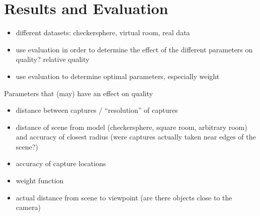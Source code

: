 \chapter{Results and Evaluation}

\begin{itemize}
  \item different datasets: checkersphere, virtual room, real data
  \item use evaluation in order to determine the effect of the different parameters on quality? \ar relative quality
  \item use evaluation to determine optimal parameters, especially weight
\end{itemize}

Parameters that (may) have an effect on quality
\begin{itemize}
  \item distance between captures / ``resolution'' of captures
  \item distance of scene from model (checkersphere, square room, arbitrary room) and accuracy of closest radius (were captures actually taken near edges of the scene?)
  \item accuracy of capture locations
  \item weight function
  \item actual distance from scene to viewpoint (are there objects close to the camera)
\end{itemize}
